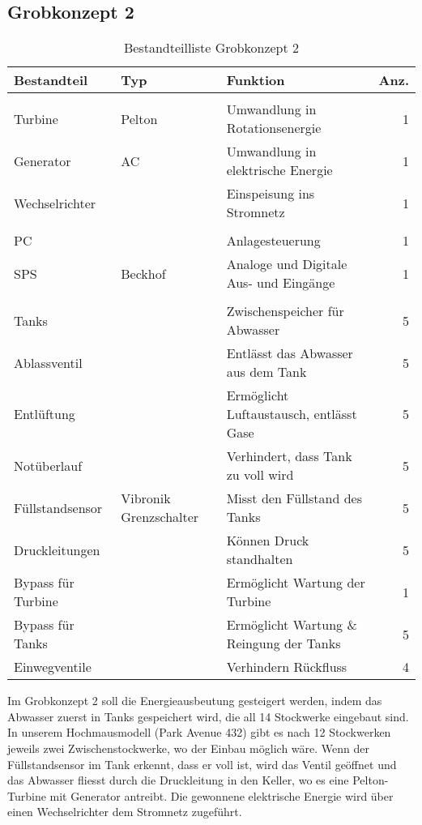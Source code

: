 \subsection{Grobkonzept 2} \label{subsec:grobkonzept2}
\begin{table}[H]
\small
\begin{tabular}{>{\HY\RaggedRight}p{3cm} >{\HY\RaggedRight}p{3.6cm} >{\HY\RaggedRight}p{6.9cm} r}
\hline
\textbf{Bestandteil}&\textbf{Typ}&\textbf{Funktion}&\textbf{Anz.}\\
\hline

\rowcolor{hellgrau}
\multicolumn{4}{l}{\textbf{Stromerzeugung}}\T\\
Turbine&Pelton&Umwandlung in Rotationsenergie&1\\
Generator&AC&Umwandlung in elektrische Energie&1\\
Wechselrichter&&Einspeisung ins Stromnetz&1\B\\

\rowcolor{hellgrau}
\multicolumn{4}{l}{\textbf{Kontrollsystem}}\T\\
PC&&Anlagesteuerung&1\\
SPS&Beckhof&Analoge und Digitale Aus- und Eingänge&1\B\\

\rowcolor{hellgrau}
\multicolumn{4}{l}{\textbf{Abwassertechnik}}\T\\
Tanks&&Zwischenspeicher für Abwasser&5\\
Ablassventil&&Entlässt das Abwasser aus dem Tank&5\\
Entlüftung&&Ermöglicht Luftaustausch, entlässt Gase&5\\
Notüberlauf&&Verhindert, dass Tank zu voll wird&5\\
Füllstandsensor&Vibronik Grenzschalter &Misst den Füllstand des Tanks&5\\
Druckleitungen&&Können Druck standhalten&5\\
Bypass für Turbine&&Ermöglicht Wartung der Turbine&1\\
Bypass für Tanks&&Ermöglicht Wartung \& Reingung der Tanks&5\\
Einwegventile&&Verhindern Rückfluss&4\B\\
\hline
\end{tabular}
\caption{Bestandteilliste Grobkonzept 2}\label{tab:BLGrobkonzept2}
\end{table}
Im Grobkonzept 2 soll die Energieausbeutung gesteigert werden, indem das Abwasser zuerst in Tanks gespeichert wird, die all 14 Stockwerke eingebaut sind. In unserem Hochmausmodell (Park Avenue 432) gibt es nach 12 Stockwerken jeweils zwei Zwischenstockwerke, wo der Einbau möglich wäre. Wenn der Füllstandsensor im Tank erkennt, dass er voll ist, wird das Ventil geöffnet und das Abwasser fliesst durch die Druckleitung in den Keller, wo es eine Pelton-Turbine mit Generator antreibt. Die gewonnene elektrische Energie wird über einen Wechselrichter dem Stromnetz zugeführt. \\ 
